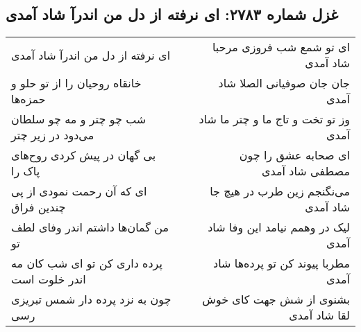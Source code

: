 \begin{center}
\section*{غزل شماره ۲۷۸۳: ای نرفته از دل من اندرآ شاد آمدی}
\label{sec:2783}
\begin{longtable}{l p{0.5cm} r}
ای نرفته از دل من اندرآ شاد آمدی
&&
ای تو شمع شب فروزی مرحبا شاد آمدی
\\
خانقاه روحیان را از تو حلو و حمزه‌ها
&&
جان جان صوفیانی الصلا شاد آمدی
\\
شب چو چتر و مه چو سلطان می‌دود در زیر چتر
&&
وز تو تخت و تاج ما و چتر ما شاد آمدی
\\
بی گهان در پیش کردی روح‌های پاک را
&&
ای صحابه عشق را چون مصطفی شاد آمدی
\\
ای که آن رحمت نمودی از پی چندین فراق
&&
می‌نگنجم زین طرب در هیچ جا شاد آمدی
\\
من گمان‌ها داشتم اندر وفای لطف تو
&&
لیک در وهمم نیامد این وفا شاد آمدی
\\
پرده داری کن تو ای شب کان مه اندر خلوت است
&&
مطربا پیوند کن تو پرده‌ها شاد آمدی
\\
چون به نزد پرده دار شمس تبریزی رسی
&&
بشنوی از شش جهت کای خوش لقا شاد آمدی
\\
\end{longtable}
\end{center}

